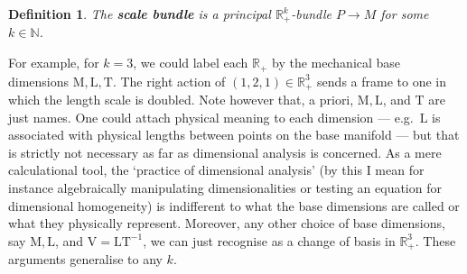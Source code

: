 \documentclass[12pt]{article}
\numberwithin{equation}{section}
\newcommand{\R}{\mathbb{R}}
\newcommand{\N}{\mathbb{N}}
\newtheorem{definition}[theorem]{Definition}
\begin{document}
\begin{definition}
	The \textbf{scale bundle} is a principal $\R_+^k$-bundle $P\to M$ for some $k\in \N$. 
\end{definition}

For example, for $k=3$, we could label each $\R_+$ by the mechanical base dimensions $\mathrm{M,L,T}$. The right action of $(1,2,1)\in \R_+^3$ sends a frame to one in which the length scale is doubled. Note however that, a priori, $\mathrm{M,L}$, and $\mathrm{T}$ are just names. One could attach physical meaning to each dimension --- e.g.~$\mathrm{L}$ is associated with physical lengths between points on the base manifold --- but that is strictly not necessary as far as dimensional analysis is concerned. As a mere calculational tool, the `practice of dimensional analysis' (by this I mean for instance algebraically manipulating dimensionalities or testing an equation for dimensional homogeneity) is indifferent to what the base dimensions are called or what they physically represent. Moreover, any other choice of base dimensions, say $\mathrm{M,L}$, and $\mathrm{V=LT^{-1}}$, we can just recognise as a change of basis in $\R_+^3$. These arguments generalise to any $k$.
\end{document}
